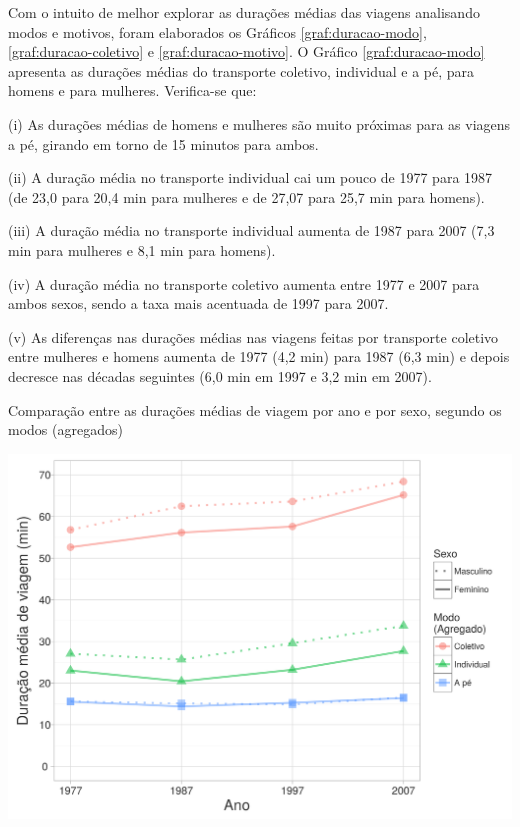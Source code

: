 Com o intuito de melhor explorar as durações médias das viagens analisando modos e motivos, foram elaborados os Gráficos \ref{graf:duracao-modo}, \ref{graf:duracao-coletivo} e \ref{graf:duracao-motivo}.
O Gráfico \ref{graf:duracao-modo} apresenta as durações médias do transporte coletivo, individual e a pé, para homens e para mulheres. Verifica-se que:
\begin{compactitem}[]
\item (i) As durações médias de homens e mulheres são muito próximas para as viagens a pé, girando em torno de 15 minutos para ambos.
\item (ii) A duração média no transporte individual cai um pouco de 1977 para 1987 (de 23,0 para 20,4 min para mulheres e de 27,07 para 25,7 min para homens).
\item (iii) A duração média no transporte individual aumenta de 1987 para 2007 (7,3 min para mulheres e 8,1 min para homens).
\item (iv) A duração média no transporte coletivo aumenta entre 1977 e 2007 para ambos sexos, sendo a taxa mais acentuada de 1997 para 2007. 
\item (v) As diferenças nas durações médias nas viagens feitas por transporte coletivo entre mulheres e homens aumenta de 1977 (4,2 min) para 1987 (6,3 min) e depois decresce nas décadas seguintes (6,0 min em 1997 e 3,2 min em 2007).
\end{compactitem}

\begin{grafico}[htb]%
    \caption{\label{graf:duracao-modo}Comparação entre as durações médias de viagem por ano e por sexo, segundo os modos (agregados)}%
    \begin{center}%
        \includegraphics[width=1\textwidth]{./imagens/duracao-modo.png}%
    \end{center}%
\end{grafico}%

